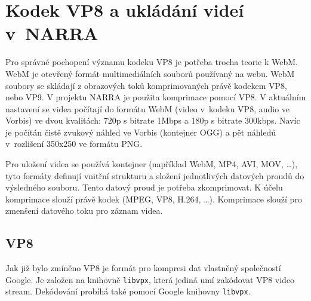 \section {Kodek VP8 a ukládání videí v~NARRA}
\par Pro správné pochopení významu kodeku VP8\cite{vp8} je potřeba trocha teorie k WebM\cite{webm}. WebM je otevřený formát multimediálních souborů používaný na webu. WebM soubory se skládají z obrazových toků komprimovaných právě kodekem VP8, nebo VP9. V projektu NARRA je použita komprimace pomocí VP8. V aktuálním nastavení se videa počítají do formátu WebM (video v~kodeku VP8, audio ve Vorbis) ve dvou kvalitách: 720p s bitrate 1Mbps a 180p s bitrate 300kbps. Navíc je počítán čistě zvukový náhled ve Vorbis (kontejner OGG) a pět náhledů v~rozlišení 350x250 ve formátu PNG. 
\par Pro uložení videa se používá kontejner (například WebM, MP4, AVI, MOV, \ldots), tyto formáty definují vnitřní strukturu a složení jednotlivých datových proudů do výsledného souboru. Tento datový proud je potřeba zkomprimovat. K účelu komprimace slouží právě kodek (MPEG, VP8, H.264, \ldots). Komprimace slouží pro zmenšení datového toku pro záznam videa.
\subsection{VP8}
\par Jak již bylo zmíněno VP8 je formát pro kompresi dat vlastněný společností Google. Je založen na knihovně \texttt{libvpx}, která jediná umí zakódovat VP8 video stream. Dekódování probíhá také pomocí Google knihovny \texttt{libvpx}.
